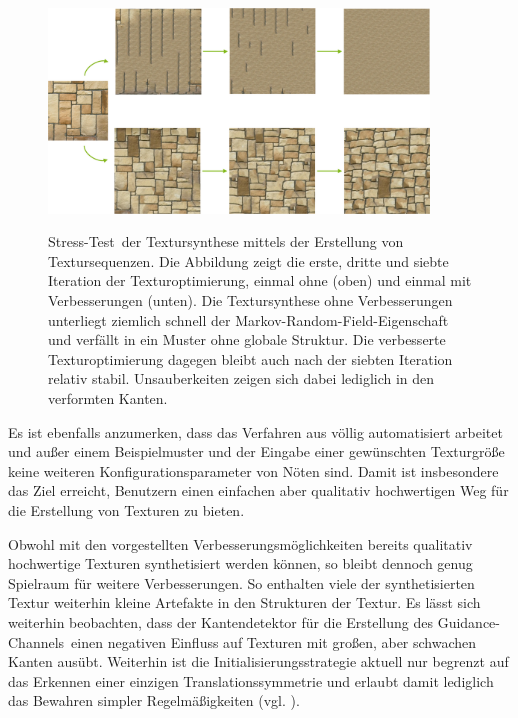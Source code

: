 \begin{figure}[h]
	\centering
	\includegraphics[width=0.9\textwidth]{images/textur-sequence-1}
	\label{textursequenzen}
	\caption{
	\glqq Stress-Test\grqq \ der Textursynthese mittels der Erstellung von Textursequenzen.
	Die Abbildung zeigt die erste, dritte und siebte Iteration der Texturoptimierung, einmal ohne (oben) und einmal mit Verbesserungen (unten).
	Die Textursynthese ohne Verbesserungen unterliegt ziemlich schnell der \glqq Markov-Random-Field\grqq -Eigenschaft und verfällt in ein Muster ohne globale Struktur.
	Die verbesserte Texturoptimierung dagegen bleibt auch nach der siebten Iteration relativ stabil.
	Unsauberkeiten zeigen sich dabei lediglich in den verformten Kanten.
	}
\end{figure}

Es ist ebenfalls anzumerken, dass das Verfahren aus \cite{SelfTuning} völlig automatisiert arbeitet und außer einem Beispielmuster und der Eingabe einer gewünschten Texturgröße keine weiteren Konfigurationsparameter von Nöten sind.
Damit ist insbesondere das Ziel erreicht, Benutzern einen einfachen aber qualitativ hochwertigen Weg für die Erstellung von Texturen zu bieten.

Obwohl mit den vorgestellten Verbesserungsmöglichkeiten bereits qualitativ hochwertige Texturen synthetisiert werden können, so bleibt dennoch genug Spielraum für weitere Verbesserungen.
So enthalten viele der synthetisierten Textur weiterhin kleine Artefakte in den Strukturen der Textur.
Es lässt sich weiterhin beobachten, dass der Kantendetektor für die Erstellung des \glqq Guidance-Channels\grqq \ einen negativen Einfluss auf Texturen mit großen, aber schwachen Kanten ausübt.
Weiterhin ist die Initialisierungsstrategie aktuell nur begrenzt auf das Erkennen einer einzigen Translationssymmetrie und erlaubt damit lediglich das Bewahren simpler Regelmäßigkeiten (vgl. \cite{SelfTuning}).